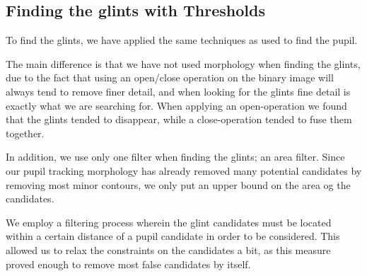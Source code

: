 \subsection{Finding the glints with Thresholds}
To find the glints, we have applied the same techniques as used to find the pupil.\newline

The main difference is that we have not used morphology when finding the glints, due to the fact that using an open/close operation on the binary image will always tend to remove finer detail, and when looking for the glints fine detail is exactly what we are searching for. When applying an open-operation we found that the glints tended to disappear, while a close-operation tended to fuse them together.\newline

In addition, we use only one filter when finding the glints; an area filter. Since our pupil tracking morphology has already removed many potential candidates by removing most minor contours, we only put an upper bound on the area og the candidates.

We employ a filtering process wherein the glint candidates must be located within a certain distance of a pupil candidate in order to be considered. This allowed us to relax the constraints on the candidates a bit, as this measure proved enough to remove most false candidates by itself.
